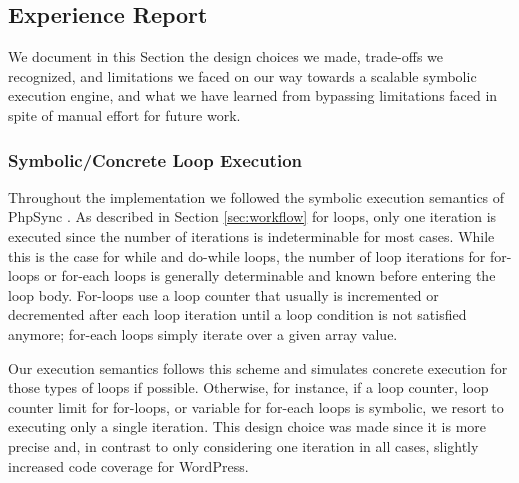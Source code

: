 \documentclass[sigconf, preprint]{acmart}
\renewcommand{\sf}[1]{\textsf{#1}}
\begin{document}
\subsection{Experience Report}\label{sec:experience_report}
We document in this Section the design choices we made, trade-offs we
recognized, and limitations we faced on our way towards a scalable symbolic
execution engine, and what we have learned from bypassing limitations faced in
spite of manual effort for future work.

\subsubsection{Symbolic/Concrete Loop Execution}
Throughout the implementation we followed the symbolic execution
semantics of \sf{PhpSync} \cite{Nguyen:2014:BCG:2635868.2635928}. As described
in Section \ref{sec:workflow} for loops, only one iteration is executed since
the number of iterations is indeterminable for most cases. While this is the
case for while and do-while loops, the number of loop iterations for for-loops
or for-each loops is generally determinable and known before entering the loop
body. For-loops use a loop counter that usually is incremented or decremented
after each loop iteration until a loop condition is not satisfied anymore;
for-each loops simply iterate over a given array value.

Our execution semantics follows this scheme and simulates concrete execution
for those types of loops if possible. Otherwise, for instance, if a loop
counter, loop counter limit for for-loops, or variable for for-each loops is
symbolic, we resort to executing only a single iteration. This design choice
was made since it is more precise and, in contrast to only considering one
iteration in all cases, slightly increased code coverage for \sf{WordPress}.
\end{document}
